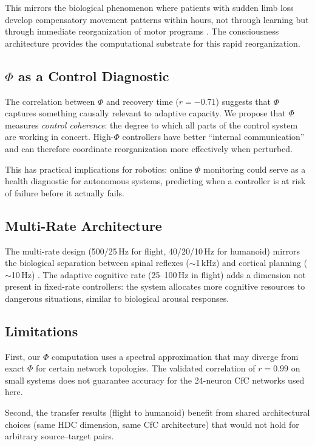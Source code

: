 \documentclass[11pt,a4paper]{article}
\begin{document}
This mirrors the biological phenomenon where patients with sudden limb loss develop compensatory movement patterns within hours, not through learning but through immediate reorganization of motor programs \citep{makin2017reassessing}.
The consciousness architecture provides the computational substrate for this rapid reorganization.

\subsection{$\Phi$ as a Control Diagnostic}

The correlation between $\Phi$ and recovery time ($r = -0.71$) suggests that $\Phi$ captures something causally relevant to adaptive capacity.
We propose that $\Phi$ measures \emph{control coherence}: the degree to which all parts of the control system are working in concert.
High-$\Phi$ controllers have better ``internal communication'' and can therefore coordinate reorganization more effectively when perturbed.

This has practical implications for robotics: online $\Phi$ monitoring could serve as a health diagnostic for autonomous systems, predicting when a controller is at risk of failure before it actually fails.

\subsection{Multi-Rate Architecture}

The multi-rate design (500/25\,Hz for flight, 40/20/10\,Hz for humanoid) mirrors the biological separation between spinal reflexes ($\sim$1\,kHz) and cortical planning ($\sim$10\,Hz) \citep{scott2004optimal}.
The adaptive cognitive rate (25--100\,Hz in flight) adds a dimension not present in fixed-rate controllers: the system allocates more cognitive resources to dangerous situations, similar to biological arousal responses.

\subsection{Limitations}

First, our $\Phi$ computation uses a spectral approximation that may diverge from exact $\Phi$ for certain network topologies.
The validated correlation of $r = 0.99$ on small systems does not guarantee accuracy for the 24-neuron CfC networks used here.

Second, the transfer results (flight to humanoid) benefit from shared architectural choices (same HDC dimension, same CfC architecture) that would not hold for arbitrary source--target pairs.
\end{document}

